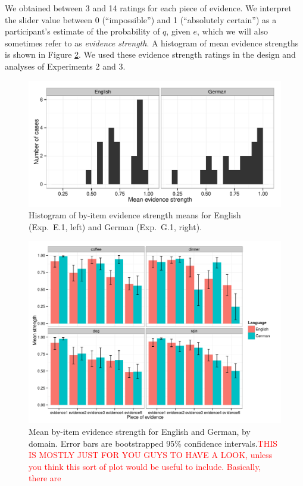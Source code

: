 \documentclass[11pt]{article}
\newcommand{\red}[1]{\textcolor{Red}{#1}}
\newcommand{\figref}[1]{Figure \ref{#1}}
\begin{document}
We obtained between 3 and 14 ratings for each piece of evidence. We interpret the slider value between 0 (``impossible'') and 1 (``absolutely certain'') as a participant's estimate of the probability of $q$, given $e$, which we will also sometimes refer to as  \emph{evidence strength}. A histogram of mean evidence strengths is shown in \figref{fig:evidencestrength}.  We used these evidence strength ratings in the design and analyses of Experiments 2 and 3.

\begin{figure}
\centering
\includegraphics[width=.9\textwidth]{pics/evidencestrength-histograms}
\caption{Histogram of by-item evidence strength means  for English (Exp.~E.1, left) and German (Exp.~G.1, right).}
\label{fig:evidencestrength}
\end{figure}

\begin{figure}
\centering
\includegraphics[width=\textwidth]{pics/mean-evidencestrength-byitem}
\caption{Mean by-item evidence strength for English and German, by domain. Error bars are bootstrapped 95\% confidence intervals.\red{THIS IS MOSTLY JUST FOR YOU GUYS TO HAVE A LOOK, unless you think this sort of plot would be useful to include. Basically, there are }}
\label{fig:evidencestrength}
\end{figure}
\end{document}
